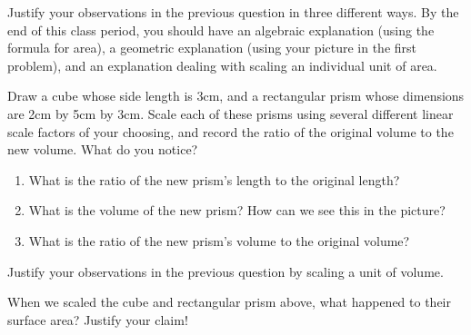 \documentclass[nooutcomes]{ximera}
\begin{document}
\begin{problem}
Justify your observations in the previous question in three different ways.  By the end of this class period, you should have an algebraic explanation (using the formula for area), a geometric explanation (using your picture in the first problem), and an explanation dealing with scaling an individual unit of area.

\end{problem}

\begin{problem}
Draw a cube whose side length is 3cm, and a rectangular prism whose dimensions are 2cm by 5cm by 3cm.  Scale each of these prisms using several different linear scale factors of your choosing, and record the ratio of the original volume to the new volume.  What do you notice?
\vskip 2.3in
\begin{enumerate}
    \item What is the ratio of the new prism's length to the original  length?
    \item What is the volume of the new prism?  How can we see this in the picture?
    \item What is the ratio of the new prism's volume to the original volume?
\end{enumerate}

\end{problem}

\begin{problem}
Justify your observations in the previous question by scaling a unit of volume.

\end{problem}

\begin{problem}
When we scaled the cube and rectangular prism above, what happened to their surface area?  Justify your claim!
\end{problem}
\end{document}
